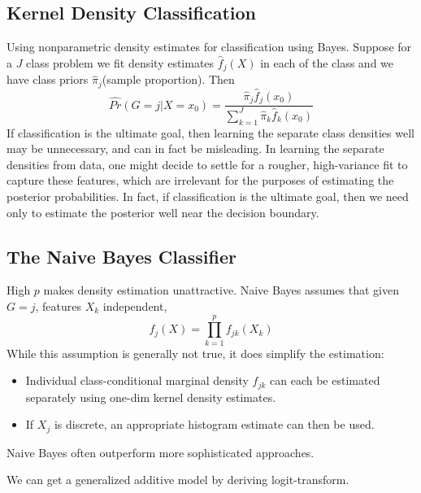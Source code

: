 \subsection{Kernel Density Classification}
Using nonparametric density estimates for classification using Bayes. 
Suppose for a $J$ class problem we fit density estimates $\hat{f}_j(X)$ in each of the class
and we have class priors $\hat{\pi}_j$(sample proportion). Then
\begin{equation*}
\hat{Pr}(G=j|X=x_0)=\frac{\hat{\pi}_j\hat{f}_j(x_0)}{\sum_{k=1}^J\hat{\pi}_k\hat{f}_k(x_0)}
\end{equation*}
If classification is the ultimate goal, then learning the separate class densities
well may be unnecessary, and can in fact be misleading. In learning the separate densities from data,
one might decide to settle for a rougher, high-variance fit to capture these
features, which are irrelevant for the purposes of estimating the posterior
probabilities. In fact, if classification is the ultimate goal, then we need only
to estimate the posterior well near the decision boundary. 

\subsection{The Naive Bayes Classifier}
High $p$ makes density estimation unattractive. Naive Bayes assumes that given $G=j$, features
$X_k$ independent, 
\begin{equation*}
f_j(X)=\prod_{k=1}^pf_{jk}(X_k)
\end{equation*}
While this assumption is generally not true, it does simplify the estimation: 
\begin{itemize}
\item Individual class-conditional marginal density $f_{jk}$ can each be estimated separately
using one-dim kernel density estimates. 
\item If $X_j$ is discrete, an appropriate histogram estimate can then be used. 
\end{itemize}
Naive Bayes often outperform more sophisticated approaches. 

We can get a generalized additive model by deriving logit-transform. 

